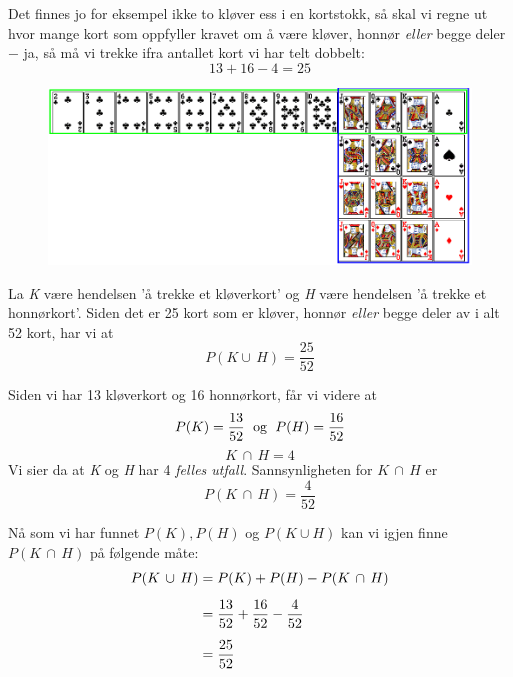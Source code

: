 Det finnes jo for eksempel ikke to kløver ess i en kortstokk, så skal vi regne ut hvor mange kort som oppfyller kravet om å være kløver, honnør \textsl{eller} begge deler $ - $ ja, så må vi trekke ifra antallet kort vi har telt dobbelt:
$$ 13+16-4=25 $$
	\begin{figure}[H]
		\centering
		\includegraphics[scale=0.45]{kort3}
	\end{figure}

La \textit{K} være hendelsen 'å trekke et kløverkort' og \textit{H} være hendelsen 'å trekke et honnørkort'. Siden det er 25 kort som er kløver, honnør \textsl{eller} begge deler av i alt 52 kort, har vi at
$$P(K\cup\,H)=\frac{25}{52}$$

Siden vi har 13 kløverkort og 16 honnørkort, får vi videre at
$$P(K)=\frac{13}{52} \text{\; og \;} P(H)=\frac{16}{52}$$
\qquad
{} \vs
\[ K\,\cap\,H=4 \]
Vi sier da at \textit{K} og \textit{H} har 4 \textit{felles utfall}.
Sannsynligheten for $K\,\cap\,H$ er
\[ P(K\,\cap\,H)=\frac{4}{52} \]

Nå som vi har funnet $ P(K), P(H)$ og $P(K\cup H)$ kan vi igjen finne  $P(K\,\cap\,H)$ på følgende måte:
\begin{align*}
P(K\,\cup\,H)&=P(K)+P(H)-P(K\,\cap\,H) \br
&= \frac{13}{52}+\frac{16}{52}-\frac{4}{52} \br
&= \frac{25}{52}
\end{align*}

